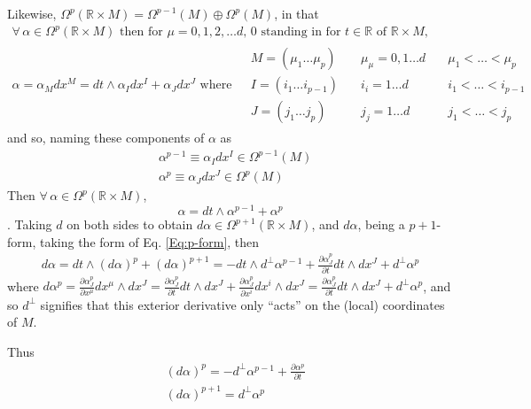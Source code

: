 \documentclass[10pt]{amsart}
\begin{document}
\begin{multicols}{2}
Likewise, $\Omega^p(\mathbb{R} \times M) = \Omega^{p-1}(M) \oplus \Omega^p(M)$, in that 
\[
\begin{gathered}
 \forall \,  \alpha \in \Omega^p(\mathbb{R} \times M) \text{ then for $\mu = 0, 1, 2, \dots d$, $0$ standing in for $t\in \mathbb{R}$ of $\mathbb{R}\times M$, }\\ 
\alpha = \alpha_M dx^M = dt \wedge \alpha_I dx^I + \alpha_J dx^J \text{ where } \begin{aligned} & M = (\mu_1 \dots \mu_p) \quad & \mu_{\mu} = 0,1 \dots d \quad & \mu_1 < \dots < \mu_p \\
  & I = (i_1 \dots i_{p-1}) \quad & i_i = 1 \dots d \quad & i_1 < \dots < i_{p-1} \\
  & J = (j_1 \dots j_{p}) \quad & j_j = 1 \dots d \quad & j_1 < \dots < j_{p} 
\end{aligned} 
\end{gathered}
\]
and so, naming these components of $\alpha$ as 
\[
\begin{aligned}
  & \alpha^{p-1} \equiv \alpha_I dx^I \in \Omega^{p-1}(M) \\ 
  & \alpha^{p} \equiv \alpha_J dx^J \in \Omega^{p}(M) 
\end{aligned}
\]
Then $\forall \, \alpha \in \Omega^p(\mathbb{R} \times M)$, 
\begin{equation}\label{Eq:p-form}
\alpha = dt \wedge \alpha^{p-1} + \alpha^p
\end{equation}.  Taking $d$ on both sides to obtain $d\alpha \in \Omega^{p+1}(\mathbb{R} \times M)$, and $d\alpha$, being a $p+1$-form, taking the form of Eq. \ref{Eq:p-form}, then
\[
\begin{gathered}
  d\alpha = dt \wedge (d\alpha)^p + (d\alpha)^{p+1} = -dt \wedge d^{\perp} \alpha^{p-1} + \frac{ \partial \alpha^p_J}{ \partial t} dt \wedge dx^J + d^{\perp}\alpha^p
\end{gathered}
\]
where $d\alpha^p = \frac{ \partial \alpha^p_J}{ \partial x^{\mu }} dx^{\mu} \wedge dx^J = \frac{ \partial \alpha^p_J}{\partial t} dt \wedge dx^J + \frac{ \partial \alpha_J^p}{ \partial x^i} dx^i \wedge dx^J = \frac{ \partial \alpha_J^p }{ \partial t} dt \wedge dx^J + d^{\perp}\alpha^p$, and so $d^{\perp}$ signifies that this exterior derivative only ``acts'' on the (local) coordinates of $M$.  

Thus
\[
\begin{aligned}
  & (d\alpha)^p = -d^{\perp} \alpha^{p-1}  + \frac{ \partial \alpha^p }{ \partial t} \\ 
  &  (d\alpha)^{p+1} = d^{\perp}\alpha^p
\end{aligned}
\]


\end{multicols}
\end{document}
